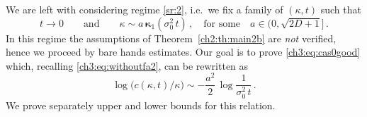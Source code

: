 \documentclass[a4paper,reqno,11pt]{amsart}
\numberwithin{equation}{section}
\newcommand\bkappa{\boldsymbol{\kappa}}
\begin{document}
We are left with considering regime \eqref{sr:2}, i.e.\ we fix a family of $(\kappa,t)$ such that
\begin{equation}\label{ch3:eq:family}
	t \to 0 \qquad\text{and}\qquad \kappa \sim a\, \bkappa_1(\sigma_0^2 \, t) \,,
	\quad \text{for some} \quad  a \in (0, \sqrt{2D+1}] \,.
\end{equation}
In this regime the assumptions of Theorem~\ref{ch2:th:main2b} are \emph{not}
verified, hence we proceed by bare hands estimates.
Our goal is to prove \eqref{ch3:eq:cas0good} which,
recalling \eqref{ch3:eq:withoutfa2}, can be rewritten as
\begin{equation}\label{ch3:eq:goalgoal}
	\log \big( c(\kappa,t)/\kappa \big) \sim 
	- \frac{a^2}{2} \, \log \frac{1}{ \sigma_0^2 \, t}  \,.
\end{equation}
We prove separately upper and lower bounds for this relation.
\end{document}
